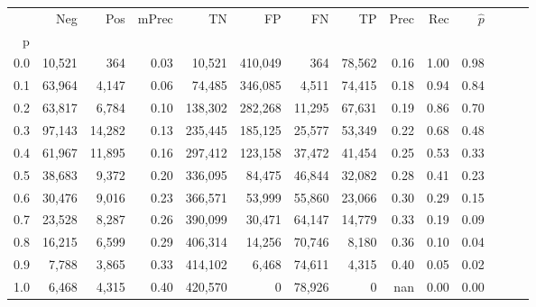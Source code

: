 \begin{tabular}{rrrrrrrrrrrrrr}
\toprule
{} &     Neg &     Pos & mPrec &       TN &       FP &      FN &      TP &  Prec &   Rec & $\hat{p}$ \\
p   &         &         &       &          &          &         &         &       &       &           \\
\midrule
0.0 &  10,521 &     364 &  0.03 &   10,521 &  410,049 &     364 &  78,562 &  0.16 &  1.00 &      0.98 \\
0.1 &  63,964 &   4,147 &  0.06 &   74,485 &  346,085 &   4,511 &  74,415 &  0.18 &  0.94 &      0.84 \\
0.2 &  63,817 &   6,784 &  0.10 &  138,302 &  282,268 &  11,295 &  67,631 &  0.19 &  0.86 &      0.70 \\
0.3 &  97,143 &  14,282 &  0.13 &  235,445 &  185,125 &  25,577 &  53,349 &  0.22 &  0.68 &      0.48 \\
0.4 &  61,967 &  11,895 &  0.16 &  297,412 &  123,158 &  37,472 &  41,454 &  0.25 &  0.53 &      0.33 \\
0.5 &  38,683 &   9,372 &  0.20 &  336,095 &   84,475 &  46,844 &  32,082 &  0.28 &  0.41 &      0.23 \\
0.6 &  30,476 &   9,016 &  0.23 &  366,571 &   53,999 &  55,860 &  23,066 &  0.30 &  0.29 &      0.15 \\
0.7 &  23,528 &   8,287 &  0.26 &  390,099 &   30,471 &  64,147 &  14,779 &  0.33 &  0.19 &      0.09 \\
0.8 &  16,215 &   6,599 &  0.29 &  406,314 &   14,256 &  70,746 &   8,180 &  0.36 &  0.10 &      0.04 \\
0.9 &   7,788 &   3,865 &  0.33 &  414,102 &    6,468 &  74,611 &   4,315 &  0.40 &  0.05 &      0.02 \\
1.0 &   6,468 &   4,315 &  0.40 &  420,570 &        0 &  78,926 &       0 &   nan &  0.00 &      0.00 \\
\bottomrule
\end{tabular}
